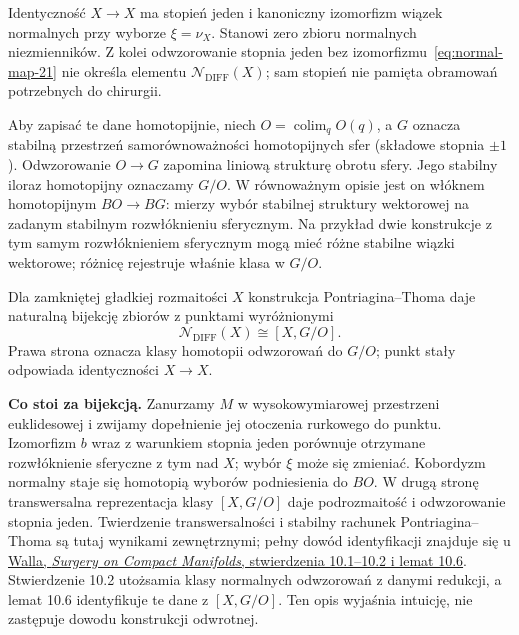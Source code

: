 \begin{przyklad}[Identyczność]
\label{prz:normalny-punkt-23}
Identyczność $X\to X$ ma stopień jeden i
kanoniczny izomorfizm wiązek normalnych
przy wyborze $\xi=\nu_X$.
Stanowi zero zbioru normalnych niezmienników.
Z kolei odwzorowanie stopnia jeden bez
izomorfizmu~\eqref{eq:normal-map-21}
nie określa elementu $\mathcal N_{\mathrm{DIFF}}(X)$;
sam stopień nie pamięta obramowań
potrzebnych do chirurgii.
\end{przyklad}

Aby zapisać te dane homotopijnie, niech
$O=\operatorname*{colim}_{q}O(q)$, a $G$ oznacza
stabilną przestrzeń samorównoważności
homotopijnych sfer (składowe stopnia $\pm1$).
Odwzorowanie $O\to G$ zapomina liniową
strukturę obrotu sfery. Jego stabilny iloraz
homotopijny oznaczamy $G/O$.
W równoważnym opisie jest on włóknem
homotopijnym $BO\to BG$: mierzy wybór
stabilnej struktury wektorowej na zadanym
stabilnym rozwłóknieniu sferycznym.
Na przykład dwie konstrukcje z tym samym
rozwłóknieniem sferycznym mogą mieć różne
stabilne wiązki wektorowe; różnicę rejestruje
właśnie klasa w $G/O$.

\begin{twierdzenie}
\label{thm:normal-invariants-GO-23}
Dla zamkniętej gładkiej rozmaitości $X$
konstrukcja Pontriagina--Thoma daje
naturalną bijekcję zbiorów z punktami
wyróżnionymi
\[
 \mathcal N_{\mathrm{DIFF}}(X)\cong [X,G/O].
\]
Prawa strona oznacza klasy homotopii
odwzorowań do $G/O$; punkt stały odpowiada
identyczności $X\to X$.
\end{twierdzenie}

\noindent\textbf{Co stoi za bijekcją.}
Zanurzamy $M$ w wysokowymiarowej przestrzeni
euklidesowej i zwijamy dopełnienie jej
otoczenia rurkowego do punktu.
Izomorfizm $b$ wraz z warunkiem stopnia jeden
porównuje otrzymane rozwłóknienie sferyczne z tym
nad $X$; wybór $\xi$ może się zmieniać.
Kobordyzm normalny staje się homotopią
wyborów podniesienia do $BO$.
W drugą stronę transwersalna reprezentacja
klasy $[X,G/O]$ daje podrozmaitość i
odwzorowanie stopnia jeden.
Twierdzenie transwersalności i stabilny
rachunek Pontriagina--Thoma są tutaj
wynikami zewnętrznymi; pełny dowód
identyfikacji znajduje się u
\href{https://webhomes.maths.ed.ac.uk/~v1ranick/books/scm.pdf}
{Walla, \emph{Surgery on Compact Manifolds},
stwierdzenia 10.1–10.2 i lemat 10.6}.
Stwierdzenie 10.2 utożsamia klasy normalnych
odwzorowań z danymi redukcji, a lemat 10.6
identyfikuje te dane z $[X,G/O]$.
Ten opis wyjaśnia intuicję, nie zastępuje
dowodu konstrukcji odwrotnej.

